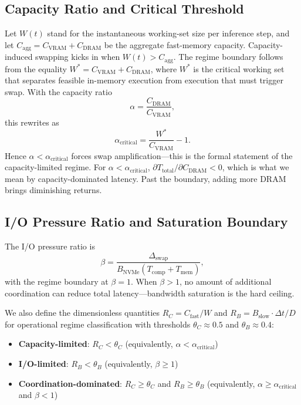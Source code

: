 \subsection{Capacity Ratio and Critical Threshold}
Let $W(t)$ stand for the instantaneous working-set size per inference step, and let $C_{\mathrm{agg}} = C_{\mathrm{VRAM}} + C_{\mathrm{DRAM}}$ be the aggregate fast-memory capacity. Capacity-induced swapping kicks in when $W(t) > C_{\mathrm{agg}}$. The regime boundary follows from the equality $W^* = C_{\mathrm{VRAM}} + C_{\mathrm{DRAM}}$, where $W^*$ is the critical working set that separates feasible in-memory execution from execution that must trigger swap. With the capacity ratio
\begin{equation}
\alpha = \frac{C_{\mathrm{DRAM}}}{C_{\mathrm{VRAM}}},
\label{eq:alpha}
\end{equation}
this rewrites as
\begin{equation}
\alpha_{\mathrm{critical}} = \frac{W^*}{C_{\mathrm{VRAM}}} - 1.
\label{eq:alpha_critical}
\end{equation}
Hence $\alpha < \alpha_{\mathrm{critical}}$ forces swap amplification---this is the formal statement of the capacity-limited regime. For $\alpha < \alpha_{\mathrm{critical}}$, $\partial T_{\mathrm{total}}/\partial C_{\mathrm{DRAM}} < 0$, which is what we mean by capacity-dominated latency. Past the boundary, adding more DRAM brings diminishing returns.

\subsection{I/O Pressure Ratio and Saturation Boundary}
The I/O pressure ratio is
\begin{equation}
\beta = \frac{\Delta_{\mathrm{swap}}}{B_{\mathrm{NVMe}}(T_{\mathrm{comp}} + T_{\mathrm{mem}})},
\label{eq:beta}
\end{equation}
with the regime boundary at $\beta = 1$. When $\beta > 1$, no amount of additional coordination can reduce total latency---bandwidth saturation is the hard ceiling.

We also define the dimensionless quantities $R_C = C_{\mathrm{fast}}/W$ and $R_B = B_{\mathrm{slow}} \cdot \Delta t / D$ for operational regime classification with thresholds $\theta_C \approx 0.5$ and $\theta_B \approx 0.4$:
\begin{itemize}
    \item \textbf{Capacity-limited}: $R_C < \theta_C$ (equivalently, $\alpha < \alpha_{\mathrm{critical}}$)
    \item \textbf{I/O-limited}: $R_B < \theta_B$ (equivalently, $\beta \geq 1$)
    \item \textbf{Coordination-dominated}: $R_C \geq \theta_C$ and $R_B \geq \theta_B$ (equivalently, $\alpha \geq \alpha_{\mathrm{critical}}$ and $\beta < 1$)
\end{itemize}

